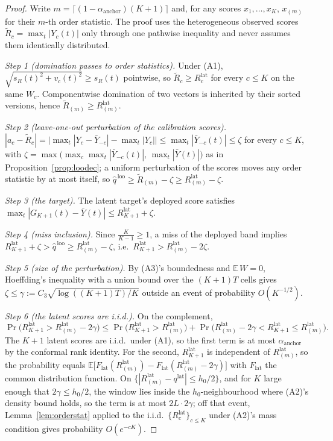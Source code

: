 \documentclass[12pt]{article}
\theoremstyle{definition}
\theoremstyle{remark}
\begin{document}
\begin{proof}
Write $m=\lceil(1-\alpha_{\text{anchor}})(K{+}1)\rceil$ and, for any scores
$x_1,\dots,x_K$, $x_{(m)}$ for their $m$-th order statistic. The proof uses
the heterogeneous observed scores $\widetilde R_c=\max_t|Y_c(t)|$ only through
one pathwise inequality and never assumes them identically distributed.

\emph{Step 1 (domination passes to order statistics).} Under (A1),
$\sqrt{s_R(t)^2+v_c(t)^2}\ge s_R(t)$ pointwise, so $\widetilde R_c\ge
R^{\text{lat}}_c$ for every $c\le K$ on the same $W_c$. Componentwise
domination of two vectors is inherited by their sorted versions, hence
$\widetilde R_{(m)}\ge R^{\text{lat}}_{(m)}$.

\emph{Step 2 (leave-one-out perturbation of the calibration scores).}
$|a_c-\widetilde R_c|=\big|\max_t|Y_c-\bar Y_{-c}|-\max_t|Y_c|\big|\le
\max_t|\bar Y_{-c}(t)|\le\zeta$ for every $c\le K$, with
$\zeta=\max\big(\max_c\max_t|\bar Y_{-c}(t)|,\,\max_t|\bar Y(t)|\big)$ as in
Proposition~\ref{prop:loodec}; a uniform perturbation of the scores moves any
order statistic by at most itself, so
$\widehat q^{\,\text{loo}}\ge\widetilde R_{(m)}-\zeta\ge R^{\text{lat}}_{(m)}-\zeta$.

\emph{Step 3 (the target).} The latent target's deployed score satisfies
$\max_t|G_{K+1}(t)-\bar Y(t)|\le R^{\text{lat}}_{K+1}+\zeta$.

\emph{Step 4 (miss inclusion).} Since $\tfrac{K}{K-1}\ge1$, a miss of the
deployed band implies $R^{\text{lat}}_{K+1}+\zeta>\widehat q^{\,\text{loo}}
\ge R^{\text{lat}}_{(m)}-\zeta$, i.e.\ $R^{\text{lat}}_{K+1}>R^{\text{lat}}_{(m)}-2\zeta$.

\emph{Step 5 (size of the perturbation).} By (A3)'s boundedness and
$\mathbb E\,W=0$, Hoeffding's inequality with a union bound over the
$(K{+}1)T$ cells gives $\zeta\le\gamma:=C_3\sqrt{\log((K{+}1)T)/K}$ outside
an event of probability $O(K^{-1/2})$.

\emph{Step 6 (the latent scores are i.i.d.).} On the complement,
\[
\Pr\big(R^{\text{lat}}_{K+1}>R^{\text{lat}}_{(m)}-2\gamma\big)\le
\Pr\big(R^{\text{lat}}_{K+1}>R^{\text{lat}}_{(m)}\big)
+\Pr\big(R^{\text{lat}}_{(m)}-2\gamma<R^{\text{lat}}_{K+1}\le R^{\text{lat}}_{(m)}\big).
\]
The $K{+}1$ latent scores are i.i.d.\ under (A1), so the first term is at most
$\alpha_{\text{anchor}}$ by the conformal rank identity. For the second,
$R^{\text{lat}}_{K+1}$ is independent of $R^{\text{lat}}_{(m)}$, so the
probability equals $\mathbb E\big[F_{\text{lat}}(R^{\text{lat}}_{(m)})-
F_{\text{lat}}(R^{\text{lat}}_{(m)}-2\gamma)\big]$ with $F_{\text{lat}}$ the
common distribution function. On $\{|R^{\text{lat}}_{(m)}-q^{\text{lat}}|\le
h_0/2\}$, and for $K$ large enough that $2\gamma\le h_0/2$, the window lies
inside the $h_0$-neighbourhood where (A2)'s density bound holds, so the term
is at most $2L\cdot2\gamma$; off that event, Lemma~\ref{lem:orderstat}
applied to the i.i.d.\ $\{R^{\text{lat}}_c\}_{c\le K}$ under (A2)'s mass
condition gives probability $O(e^{-cK})$.


\end{proof}
\end{document}
